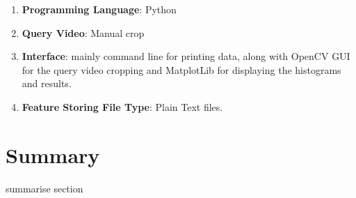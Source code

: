 \begin{enumerate}
    \item \textbf{Programming Language}: Python
    \item \textbf{Query Video}: Manual crop
    \item \textbf{Interface}: mainly command line for printing data, along with OpenCV GUI for the query video cropping and MatplotLib for displaying the histograms and results.
    \item \textbf{Feature Storing File Type}: Plain Text files.
\end{enumerate}

\section{Summary}

summarise section
